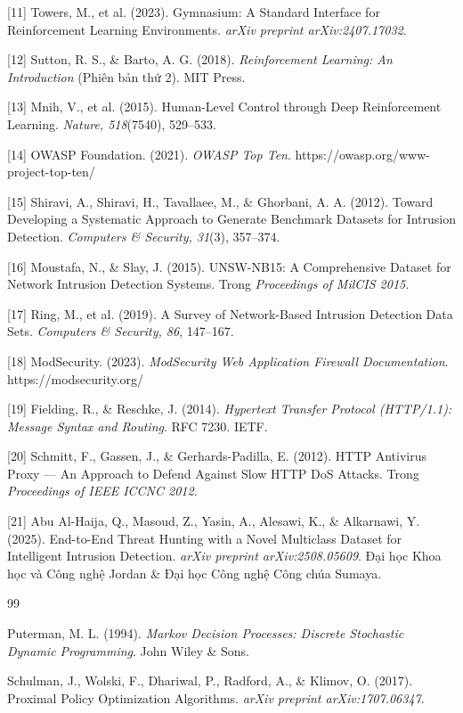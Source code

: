\documentclass[12pt,a4paper,twoside]{report}
\begin{document}
{{{{{{{{{{{{{{[11] Towers, M., et al. (2023). Gymnasium: A Standard Interface for Reinforcement Learning Environments. \textit{arXiv preprint arXiv:2407.17032}.

[12] Sutton, R. S., & Barto, A. G. (2018). \textit{Reinforcement Learning: An Introduction} (Phiên bản thứ 2). MIT Press.

[13] Mnih, V., et al. (2015). Human-Level Control through Deep Reinforcement Learning. \textit{Nature, 518}(7540), 529–533.

[14] OWASP Foundation. (2021). \textit{OWASP Top Ten}. https://owasp.org/www-project-top-ten/

[15] Shiravi, A., Shiravi, H., Tavallaee, M., & Ghorbani, A. A. (2012). Toward Developing a Systematic Approach to Generate Benchmark Datasets for Intrusion Detection. \textit{Computers & Security, 31}(3), 357–374.

[16] Moustafa, N., & Slay, J. (2015). UNSW-NB15: A Comprehensive Dataset for Network Intrusion Detection Systems. Trong \textit{Proceedings of MilCIS 2015}.

[17] Ring, M., et al. (2019). A Survey of Network-Based Intrusion Detection Data Sets. \textit{Computers & Security, 86}, 147–167.

[18] ModSecurity. (2023). \textit{ModSecurity Web Application Firewall Documentation}. https://modsecurity.org/

[19] Fielding, R., & Reschke, J. (2014). \textit{Hypertext Transfer Protocol (HTTP/1.1): Message Syntax and Routing}. RFC 7230. IETF.

[20] Schmitt, F., Gassen, J., & Gerhards-Padilla, E. (2012). HTTP Antivirus Proxy — An Approach to Defend Against Slow HTTP DoS Attacks. Trong \textit{Proceedings of IEEE ICCNC 2012}.

[21] Abu Al-Haija, Q., Masoud, Z., Yasin, A., Alesawi, K., & Alkarnawi, Y. (2025). End-to-End Threat Hunting with a Novel Multiclass Dataset for Intelligent Intrusion Detection. \textit{arXiv preprint arXiv:2508.05609}. Đại học Khoa học và Công nghệ Jordan & Đại học Công nghệ Công chúa Sumaya.


\begin{thebibliography}{99}

 Puterman, M. L. (1994). \textit{Markov Decision Processes: Discrete Stochastic Dynamic Programming}. John Wiley \& Sons.

 Schulman, J., Wolski, F., Dhariwal, P., Radford, A., \& Klimov, O. (2017). Proximal Policy Optimization Algorithms. \textit{arXiv preprint arXiv:1707.06347}.


\end{thebibliography}}}}}}}}}}}}}}}
\end{document}
